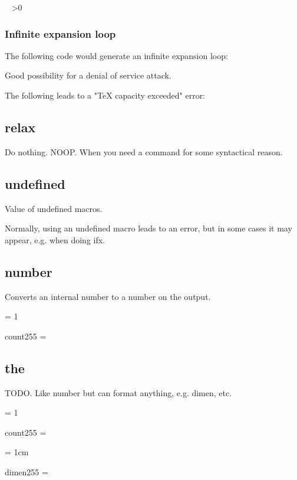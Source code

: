     \newcount\foo
    \loop
      \number\foo\ 
      \advance {}
    \ifnum\foo>0
    \repeat

    \subsubsection{Infinite expansion loop}

      The following code would generate an infinite expansion loop: %

      Good possibility for a denial of service attack.

      The following leads to a "TeX capacity exceeded" error: %

  \subsection{relax}

    Do nothing. NOOP. When you need a command for some syntactical reason.

    \relax

  \subsection{undefined}

    Value of undefined macros.

    Normally, using an undefined macro leads to an error, but in some cases it may appear, e.g. when doing ifx.

  \subsection{number}

    Converts an internal number to a number on the output.

     = 1

    count255 = \number{}

  \subsection{the}

    TODO. Like number but can format anything, e.g. dimen, etc.

     = 1

    count255 = \the{}

     = 1cm

    dimen255 = \the{}

